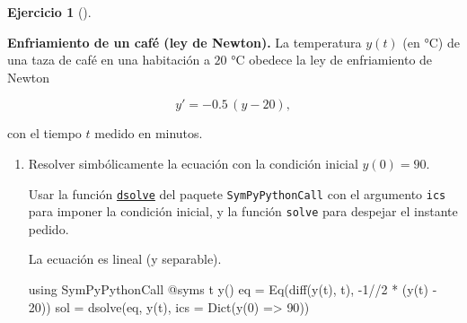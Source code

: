 \documentclass[
  spanish,
  a4paper,
]{scrreport}
\newenvironment{Shaded}{\begin{snugshade}}{\end{snugshade}}
\newcommand{\BuiltInTok}[1]{\textcolor[rgb]{0.00,0.23,0.31}{#1}}
\newcommand{\FloatTok}[1]{\textcolor[rgb]{0.68,0.00,0.00}{#1}}
\newcommand{\FunctionTok}[1]{\textcolor[rgb]{0.28,0.35,0.67}{#1}}
\newcommand{\ImportTok}[1]{\textcolor[rgb]{0.00,0.46,0.62}{#1}}
\newcommand{\NormalTok}[1]{\textcolor[rgb]{0.00,0.23,0.31}{#1}}
\newcommand{\OperatorTok}[1]{\textcolor[rgb]{0.37,0.37,0.37}{#1}}
\newcommand{\PreprocessorTok}[1]{\textcolor[rgb]{0.68,0.00,0.00}{#1}}
\theoremstyle{definition}
\newtheorem{exercise}{Ejercicio}[chapter]
\theoremstyle{remark}
\begin{document}
\begin{exercise}[]\protect\hypertarget{exr-campo-direcciones-enfriamiento}{}\label{exr-campo-direcciones-enfriamiento}

\textbf{Enfriamiento de un café (ley de Newton).} La temperatura
\(y(t)\) (en °C) de una taza de café en una habitación a \(20\) °C
obedece la ley de enfriamiento de Newton

\[
y' = -0.5\,(y - 20),
\]

con el tiempo \(t\) medido en minutos.

\begin{enumerate}
\def\labelenumi{\alph{enumi}.}
\item
  Resolver simbólicamente la ecuación con la condición inicial
  \(y(0)=90\).

  \begin{tcolorbox}[enhanced jigsaw, arc=.35mm, bottomrule=.15mm, bottomtitle=1mm, breakable, colback=white, colbacktitle=quarto-callout-note-color!10!white, colframe=quarto-callout-note-color-frame, coltitle=black, left=2mm, leftrule=.75mm, opacityback=0, opacitybacktitle=0.6, rightrule=.15mm, title=\textcolor{quarto-callout-note-color}{\faInfo}\hspace{0.5em}{Ayuda}, titlerule=0mm, toprule=.15mm, toptitle=1mm]

  Usar la función
  \href{https://docs.juliahub.com/SymPyPythonCall/}{\texttt{dsolve}} del
  paquete \texttt{SymPyPythonCall} con el argumento \texttt{ics} para
  imponer la condición inicial, y la función \texttt{solve} para
  despejar el instante pedido.

  \end{tcolorbox}

  \begin{tcolorbox}[enhanced jigsaw, arc=.35mm, bottomrule=.15mm, bottomtitle=1mm, breakable, colback=white, colbacktitle=quarto-callout-tip-color!10!white, colframe=quarto-callout-tip-color-frame, coltitle=black, left=2mm, leftrule=.75mm, opacityback=0, opacitybacktitle=0.6, rightrule=.15mm, title=\textcolor{quarto-callout-tip-color}{\faLightbulb}\hspace{0.5em}{Solución}, titlerule=0mm, toprule=.15mm, toptitle=1mm]

  La ecuación es lineal (y separable).

\begin{Shaded}
\begin{Highlighting}[]
\ImportTok{using} \BuiltInTok{SymPyPythonCall}
\PreprocessorTok{@syms}\NormalTok{ t }\FunctionTok{y}\NormalTok{()}
\NormalTok{eq }\OperatorTok{=} \FunctionTok{Eq}\NormalTok{(}\FunctionTok{diff}\NormalTok{(}\FunctionTok{y}\NormalTok{(t), t), }\OperatorTok{{-}}\FloatTok{1}\OperatorTok{//}\FloatTok{2} \OperatorTok{*}\NormalTok{ (}\FunctionTok{y}\NormalTok{(t) }\OperatorTok{{-}} \FloatTok{20}\NormalTok{))}
\NormalTok{sol }\OperatorTok{=} \FunctionTok{dsolve}\NormalTok{(eq, }\FunctionTok{y}\NormalTok{(t), ics }\OperatorTok{=} \FunctionTok{Dict}\NormalTok{(}\FunctionTok{y}\NormalTok{(}\FloatTok{0}\NormalTok{) }\OperatorTok{=\textgreater{}} \FloatTok{90}\NormalTok{))}
\end{Highlighting}
\end{Shaded}


\end{tcolorbox}
\end{enumerate}
\end{exercise}
\end{document}
